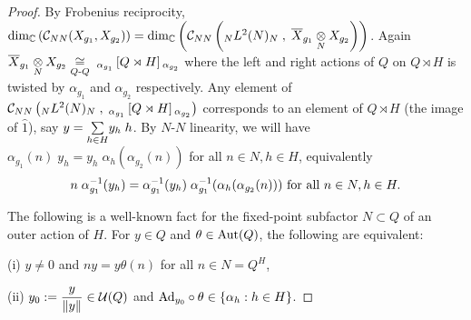 \begin{proof}
By Frobenius reciprocity, $ \text{dim}_{\mathbb{C}} \left( \mathcal C_{NN} (X_{g_1} , X_{g_2}) \right) = \text{dim}_{\mathbb{C}} \left( \mathcal C_{NN} \left( _N L^2 (N) _N \; , \; \overline{X}_{g_1} \underset{N}{\otimes} X_{g_2}\right) \right) $.
Again $  \overline{X}_{g_1} \underset{N}{\otimes} X_{g_2} \underset{Q\text{-} Q}{\cong} \; {}_{\alpha_{g_1}} \left[ Q \rtimes H \right] {}_{\alpha_{g_2}}$ where the left and right actions of $ Q $ on $ Q\rtimes H $ is twisted by $ \alpha_{g_1} $ and $ \alpha_{g_2} $ respectively.
Any element of $ \mathcal C_{NN} \left( _N L^2 (N) _N \; , \; {}_{\alpha_{g_1}} \left[ Q \rtimes H \right] {}_{\alpha_{g_2}}\right) $ corresponds to an element of $ Q\rtimes H $ (the image of $ \hat 1 $), say $y = \underset{h\in H}{\sum} y_h \; h$.
By $ N $-$ N $ linearity, we will have $ \alpha_{g_1} (n) \; y_h = y_h \; \alpha_h (\alpha_{g_2} (n)) $ for all $  n\in N, h\in H $, equivalently
\[
n \; \alpha^{-1}_{g_1} (y_h) = \alpha^{-1}_{g_1} (y_h) \; \alpha^{-1}_{g_1}(\alpha_h (\alpha_{g_2} (n))) \text{ for all }  n\in N, h\in H.
\]

The following is a well-known fact for the fixed-point subfactor $ N\subset Q $ of an outer action of $ H $. For $ y \in Q $ and $ \theta \in \text{Aut} (Q) $, the following are equivalent:

(i) $ y \neq 0 $ and $ n y = y \theta (n) $ for all $ n \in N = Q^H $,

(ii) $ y_0 := \displaystyle \frac {y}{\left\|{y}\right\|} \in \mathcal U (Q)$ and $ \text{Ad}_{y_0} \circ \theta \in \{\alpha_h : h \in H\} $.


\end{proof}
